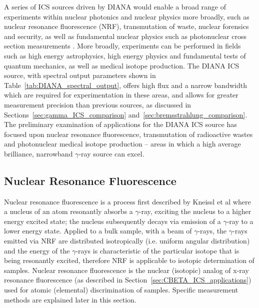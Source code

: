 \documentclass[../main.tex]{subfiles}
\begin{document}
A series of ICS sources driven by DIANA would enable a broad range of experiments within nuclear photonics \cite{nedorezov2017nuclear,budker2021expanding} and nuclear physics more broadly, such as nuclear resonance fluorescence (NRF), transmutation of waste, nuclear forensics and security, as well as fundamental nuclear physics such as photonuclear cross section measurements \cite{renstrom2018verification}.
More broadly, experiments can be performed in fields such as high energy astrophysics, high energy physics and fundamental tests of quantum mechanics, as well as medical isotope production. The DIANA ICS source, with spectral output parameters shown in Table~\ref{tab:DIANA_spectral_output}, offers high flux and a narrow bandwidth which are required for experimentation in these areas, and allows for greater measurement precision than previous sources, as discussed in Sections~\ref{sec:gamma_ICS_comparison} and~\ref{sec:bremsstrahlung_comparison}. The preliminary examination of applications for the DIANA ICS source has focused upon nuclear resonance fluorescence, transmutation of radioactive wastes and photonuclear medical isotope production -- areas in which a high average brilliance, narrowband $\gamma$-ray source can excel.  

\subsection{Nuclear Resonance Fluorescence}

Nuclear resonance fluorescence is a process first described by Kneissl et al \cite{kneissl1996investigation} where a nucleus of an atom resonantly absorbs a $\gamma$-ray, exciting the nucleus to a higher energy excited state; the nucleus subsequently decays via emission of a $\gamma$-ray to a lower energy state. Applied to a bulk sample, with a beam of $\gamma$-rays, the $\gamma$-rays emitted via NRF are distributed isotropically (i.e. uniform angular distribution) and the energy of the $\gamma$-rays is characteristic of the particular isotope that is being resonantly excited, therefore NRF is applicable to isotopic determination of samples. Nuclear resonance fluorescence is the nuclear (isotopic) analog of x-ray resonance fluorescence (as described in Section~\ref{sec:CBETA_ICS_applications}) used for atomic (elemental) discrimination of samples. Specific measurement methods are explained later in this section. 
\end{document}
